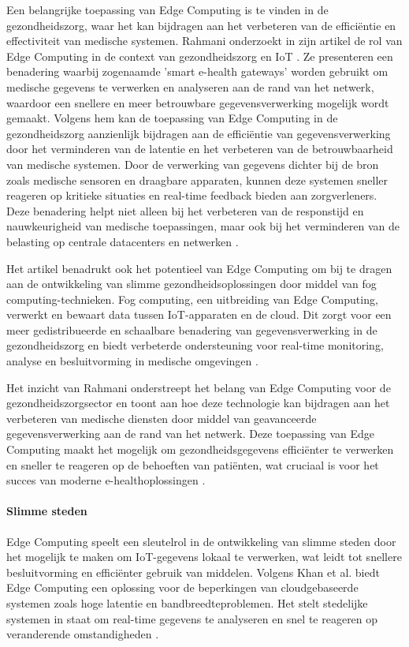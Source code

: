 Een belangrijke toepassing van Edge Computing is te vinden in de gezondheidszorg, waar het kan bijdragen aan het verbeteren van de efficiëntie en effectiviteit van medische systemen. Rahmani onderzoekt in zijn artikel de rol van Edge Computing in de context van gezondheidszorg en IoT \autocite{Rahmani2018}.
 Ze presenteren een benadering waarbij zogenaamde 'smart e-health gateways' worden gebruikt om medische gegevens te verwerken en analyseren aan de rand van het netwerk, waardoor een snellere en meer betrouwbare gegevensverwerking mogelijk wordt gemaakt.
Volgens hem kan de toepassing van Edge Computing in de gezondheidszorg aanzienlijk bijdragen aan de efficiëntie van gegevensverwerking door het verminderen van de latentie en het verbeteren van de betrouwbaarheid van medische systemen. 
 Door de verwerking van gegevens dichter bij de bron zoals medische sensoren en draagbare apparaten, kunnen deze systemen sneller reageren op kritieke situaties en real-time feedback bieden aan zorgverleners.
Deze benadering helpt niet alleen bij het verbeteren van de responstijd en nauwkeurigheid van medische toepassingen, maar ook bij het verminderen van de belasting op centrale datacenters en netwerken \autocite{Rahmani2018}.
 
Het artikel benadrukt ook het potentieel van Edge Computing om bij te dragen aan de ontwikkeling van slimme gezondheidsoplossingen door middel van fog computing-technieken. Fog computing, een uitbreiding van Edge Computing, verwerkt en bewaart data tussen IoT-apparaten en de cloud. Dit zorgt voor een meer gedistribueerde en schaalbare benadering van gegevensverwerking in de gezondheidszorg en biedt verbeterde ondersteuning voor real-time monitoring, analyse en besluitvorming in medische omgevingen \autocite{Rahmani2018}.
 
Het inzicht van Rahmani onderstreept het belang van Edge Computing voor de gezondheidszorgsector en toont aan hoe deze technologie kan bijdragen aan het verbeteren van medische diensten door middel van geavanceerde gegevensverwerking aan de rand van het netwerk.
 Deze toepassing van Edge Computing maakt het mogelijk om gezondheidsgegevens efficiënter te verwerken en sneller te reageren op de behoeften van patiënten, wat cruciaal is voor het succes van moderne e-healthoplossingen \autocite{Rahmani2018}.
 
\paragraph{Slimme steden}  
Edge Computing speelt een sleutelrol in de ontwikkeling van slimme steden door het mogelijk te maken om IoT-gegevens lokaal te verwerken, wat leidt tot snellere besluitvorming en efficiënter gebruik van middelen. Volgens Khan et al. biedt Edge Computing een oplossing voor de beperkingen van cloudgebaseerde systemen zoals hoge latentie en bandbreedteproblemen. Het stelt stedelijke systemen in staat om real-time gegevens te analyseren en snel te reageren op veranderende omstandigheden \autocite{EdgeSmartCities2023}.
 
